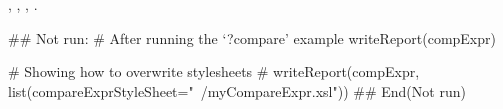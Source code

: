 \documentclass[a4paper,oneside]{book}
\begin{document}
\begin{SeeAlso}\relax
{}, ,
, .
\end{SeeAlso}
\begin{Examples}
\begin{ExampleCode}
## Not run: 
  # After running the `?compare' example
  writeReport(compExpr)

  # Showing how to overwrite stylesheets
  # writeReport(compExpr, list(compareExprStyleSheet="~/myCompareExpr.xsl"))
## End(Not run)
\end{ExampleCode}
\end{Examples}

\printindex{}
\end{document}
